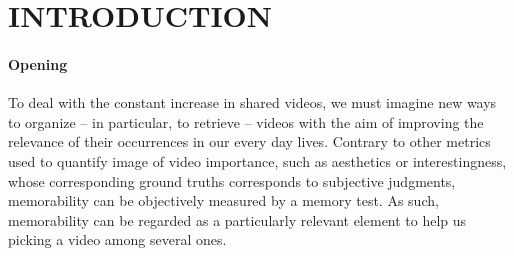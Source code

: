 \documentclass[sigconf]{acmart}
\begin{document}


\maketitle


\section{INTRODUCTION}%
\paragraph{Opening} %
To deal with the constant increase in shared videos, we must imagine new ways to organize -- in particular, to retrieve -- videos with the aim of improving the relevance of their occurrences in our every day lives.
Contrary to other metrics used to quantify image of video importance, such as aesthetics or interestingness, whose corresponding ground truths corresponds to subjective judgments, memorability can be objectively measured by a memory test.
As such, memorability can be regarded as a particularly relevant element to help us picking a video among several ones.
\end{document}
